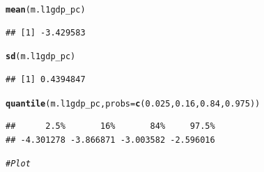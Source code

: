 \documentclass[12pt]{article}\usepackage[]{graphicx}\usepackage[]{color}
\makeatletter
\newcommand{\hlnum}[1]{\textcolor[rgb]{0.686,0.059,0.569}{#1}}%
\newcommand{\hlcom}[1]{\textcolor[rgb]{0.678,0.584,0.686}{\textit{#1}}}%
\newcommand{\hlstd}[1]{\textcolor[rgb]{0.345,0.345,0.345}{#1}}%
\newcommand{\hlkwc}[1]{\textcolor[rgb]{0.333,0.667,0.333}{#1}}%
\newcommand{\hlkwd}[1]{\textcolor[rgb]{0.737,0.353,0.396}{\textbf{#1}}}%
\newenvironment{kframe}{%
 \def\at@end@of@kframe{}%
 \ifinner\ifhmode%
  \def\at@end@of@kframe{\end{minipage}}%
  \begin{minipage}{\columnwidth}%
 \fi\fi%
 \def\FrameCommand##1{\hskip\@totalleftmargin \hskip-\fboxsep
 \colorbox{shadecolor}{##1}\hskip-\fboxsep
     \hskip-\linewidth \hskip-\@totalleftmargin \hskip\columnwidth}%
 \MakeFramed {\advance\hsize-\width
   \@totalleftmargin\z@ \linewidth\hsize
   \@setminipage}}%
 {\par\unskip\endMakeFramed%
 \at@end@of@kframe}
\newenvironment{knitrout}{}{} %
\makeatother
\begin{document}
\begin{knitrout}
\begin{kframe}
\begin{alltt}
\hlkwd{mean}\hlstd{(m.l1gdp_pc)}
\end{alltt}
\begin{verbatim}
## [1] -3.429583
\end{verbatim}
\begin{alltt}
\hlkwd{sd}\hlstd{(m.l1gdp_pc)}
\end{alltt}
\begin{verbatim}
## [1] 0.4394847
\end{verbatim}
\begin{alltt}
\hlkwd{quantile}\hlstd{(m.l1gdp_pc,} \hlkwc{probs} \hlstd{=} \hlkwd{c}\hlstd{(}\hlnum{0.025}\hlstd{,} \hlnum{0.16}\hlstd{,} \hlnum{0.84}\hlstd{,} \hlnum{0.975}\hlstd{))}
\end{alltt}
\begin{verbatim}
##      2.5%       16%       84%     97.5% 
## -4.301278 -3.866871 -3.003582 -2.596016
\end{verbatim}
\begin{alltt}
\hlcom{# Plot}


\end{alltt}
\end{kframe}
\end{knitrout}
\end{document}
